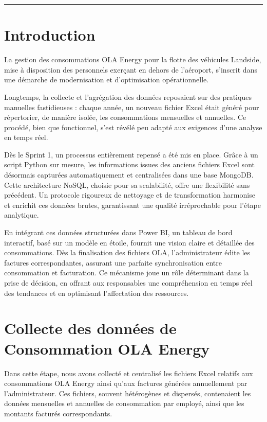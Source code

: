\documentclass[a4paper,11pt]{report}
\begin{document}
\vfill
\begin{center}
  \color{blue!60!black}\rule{0.6\textwidth}{0.8pt}
\end{center}

\newpage
\setcounter{section}{0}

\section{Introduction}

La gestion des consommations OLA Energy pour la flotte des véhicules Landside, mise à disposition des personnels exerçant en dehors de l'aéroport, s'inscrit dans une démarche de modernisation et d'optimisation opérationnelle. 

Longtemps, la collecte et l'agrégation des données reposaient sur des pratiques manuelles fastidieuses : chaque année, un nouveau fichier Excel était généré pour répertorier, de manière isolée, les consommations mensuelles et annuelles. Ce procédé, bien que fonctionnel, s'est révélé peu adapté aux exigences d'une analyse en temps réel.

Dès le Sprint 1, un processus entièrement repensé a été mis en place. Grâce à un script Python sur mesure, les informations issues des anciens fichiers Excel sont désormais capturées automatiquement et centralisées dans une base MongoDB. Cette architecture NoSQL, choisie pour sa scalabilité, offre une flexibilité sans précédent. Un protocole rigoureux de nettoyage et de transformation harmonise et enrichit ces données brutes, garantissant une qualité irréprochable pour l’étape analytique.

En intégrant ces données structurées dans Power BI, un tableau de bord interactif, basé sur un modèle en étoile, fournit une vision claire et détaillée des consommations. Dès la finalisation des fichiers OLA, l’administrateur édite les factures correspondantes, assurant une parfaite synchronisation entre consommation et facturation. Ce mécanisme joue un rôle déterminant dans la prise de décision, en offrant aux responsables une compréhension en temps réel des tendances et en optimisant l’affectation des ressources.


\section{Collecte des données de Consommation OLA Energy}

Dans cette étape, nous avons collecté et centralisé les fichiers Excel relatifs aux consommations OLA Energy ainsi qu’aux factures générées annuellement par l’administrateur. Ces fichiers, souvent hétérogènes et dispersés, contenaient les données mensuelles et annuelles de consommation par employé, ainsi que les montants facturés correspondants.
\end{document}
